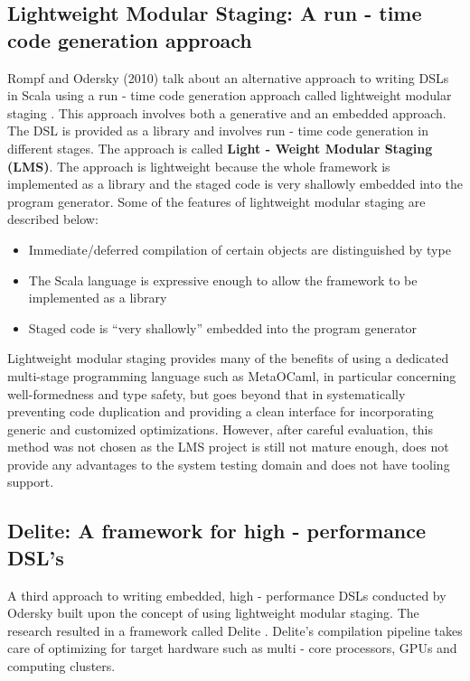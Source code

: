 \subsection{Lightweight Modular Staging: A run - time code generation approach}
Rompf and Odersky (2010) talk about an alternative approach to writing DSLs in Scala using a run - time code generation approach called lightweight modular staging \cite{lms}. This approach involves both a generative and an embedded approach. The DSL is provided as a library and involves run - time code generation in different stages. The approach is called \textbf{Light - Weight Modular Staging (LMS)}. The approach is lightweight because the whole framework is implemented as a library and the staged code is very shallowly embedded into the program generator. Some of the features of lightweight modular staging are described below:
\begin{itemize}
\item Immediate/deferred compilation of certain objects are distinguished by type
\item The Scala language is expressive enough to allow the framework to be implemented as a library
\item Staged code is “very shallowly” embedded into the program generator
\end{itemize}
\bigskip

\noindent
Lightweight modular staging provides many of the benefits of using a dedicated multi-stage programming language such as MetaOCaml, in particular concerning well-formedness and type safety, but goes beyond that in systematically preventing code duplication and providing a clean interface for incorporating generic and customized optimizations. However, after careful evaluation, this method was not chosen as the LMS project is still not mature enough, does not provide any advantages to the system testing domain and does not have tooling support.

\subsection{Delite: A framework for high - performance DSL's}
A third approach to writing embedded, high - performance DSLs conducted by Odersky built upon the concept of using lightweight modular staging. The research resulted in a framework called Delite \cite{delite}. Delite's compilation pipeline takes care of optimizing for target hardware such as multi - core processors, GPUs and computing clusters.

